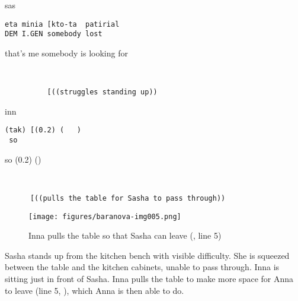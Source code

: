 \documentclass[output=paper,modfonts,nonflat]{langsci/langscibook}
\begin{document}
\vspace{2mm}
%
%
\begin{transbox}{2}{sas}
\begin{verbatim}
eta minia [kto-ta  patirial
DEM I.GEN somebody lost
\end{verbatim}
that's me somebody is looking for
\end{transbox}
%
\begin{mdframednoverticalspace}[style=firstfoc]
\begin{transbox}{3}{~}
\begin{verbatim}
          [((struggles standing up)) 
\end{verbatim}
\end{transbox}
\end{mdframednoverticalspace}
%
\begin{transbox}{4}{inn}
\begin{verbatim}
(tak) [(0.2) (   )
 so
\end{verbatim}
\hspace{0.07cm} so (0.2) (\hspace{0.5cm}) %
\end{transbox}\vspace{1mm}
%
\begin{mdframednoverticalspace}[style=secondfoc]
\begin{transbox}{5}{~}
\begin{verbatim}
      [((pulls the table for Sasha to pass through))
\end{verbatim}
\end{transbox}
\end{mdframednoverticalspace}\vspace{-1mm}
%

\begin{figure}
\caption{Inna pulls the table so that Sasha can leave (, line 5)}
\label{fig:baranova:5}
\texttt{[image: figures/baranova-img005.png]}
\end{figure}

Sasha stands up from the kitchen bench with visible difficulty. She is squeezed between the table and the kitchen cabinets, unable to pass through. Inna is sitting just in front of Sasha. Inna pulls the table to make more space for Anna to leave (line 5, ), which Anna is then able to do.
\end{document}
